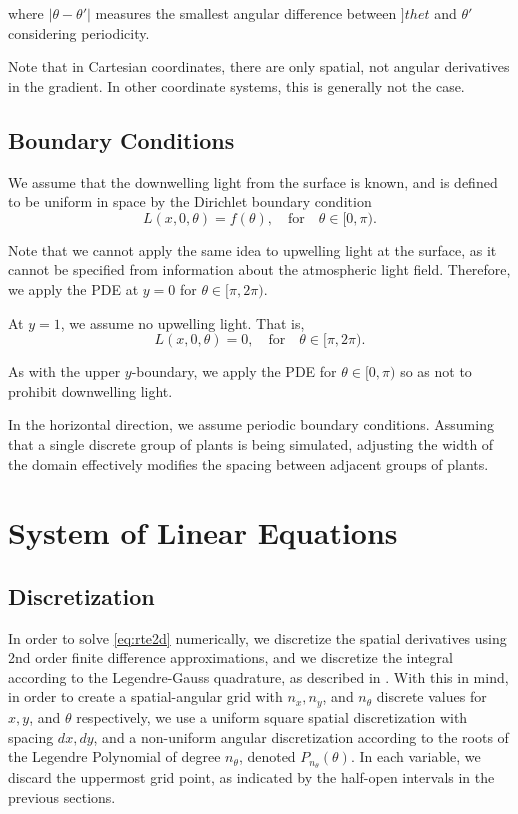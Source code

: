 \documentclass[10pt]{article}
\newcommand\abs[1]{\left| #1 \right|}
\begin{document}
\begin{multicols}{2}
where $\abs{\theta-\theta'}$ measures the smallest angular difference between $]thet$ and $\theta'$ considering periodicity.

Note that in Cartesian coordinates, there are only spatial, not angular derivatives in the gradient.
In other coordinate systems, this is generally not the case.

\subsection{Boundary Conditions}
We assume that the downwelling light from the surface is known, and is defined to be uniform in space by the Dirichlet boundary condition
\begin{equation}
    L(x,0,\theta) = f(\theta), \quad \mbox{for} \quad \theta \in [0,\pi).
    \label{eq:surf_bc}
\end{equation}

Note that we cannot apply the same idea to upwelling light at the surface, as it cannot be specified from information about the atmospheric light field.
Therefore, we apply the PDE at $y=0$ for $\theta \in [\pi,2\pi)$.

At $y=1$, we assume no upwelling light.
That is,
\begin{equation}
    L(x,0,\theta) = 0, \quad \mbox{for} \quad \theta \in [\pi,2\pi).
    \label{eq:bottom_bc}
\end{equation}

As with the upper $y$-boundary, we apply the PDE for $\theta \in [0,\pi)$ so as not to prohibit downwelling light.

In the horizontal direction, we assume periodic boundary conditions.
Assuming that a single discrete group of plants is being simulated, adjusting the width of the domain effectively modifies the spacing between adjacent groups of plants.

\section{System of Linear Equations}

\subsection{Discretization}
In order to solve \eqref{eq:rte2d} numerically, we discretize the spatial derivatives using 2nd order finite difference approximations, and we discretize the integral according to the Legendre-Gauss quadrature, as described in \citet[Chapter 2]{chandrasekhar_radiative_1960}.
With this in mind, in order to create a spatial-angular grid with $n_x,n_y$, and $n_\theta$ discrete values for $x, y$, and $\theta$ respectively, we use a uniform square spatial discretization with spacing $dx, dy$, and a non-uniform angular discretization according to the roots of the Legendre Polynomial of degree $n_\theta$, denoted $P_{n_\theta}(\theta)$.
In each variable, we discard the uppermost grid point, as indicated by the half-open intervals in the previous sections.


\end{multicols}
\end{document}
